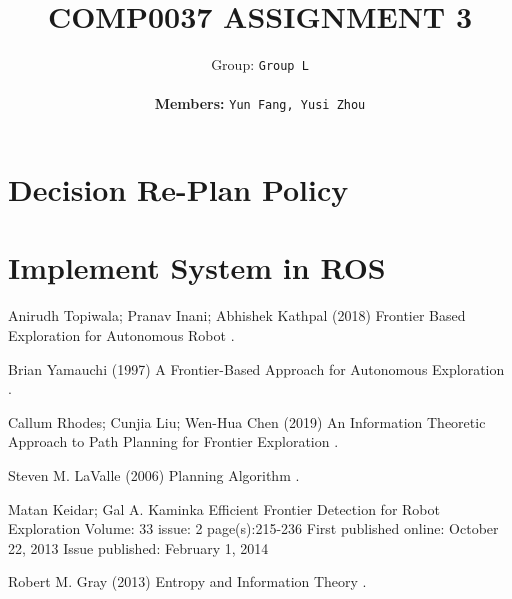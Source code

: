 \documentclass{article}
\title{COMP0037 ASSIGNMENT 3}
\author{
 Group: \texttt{Group L}\\\\
 \textbf{Members:} \texttt{Yun Fang, Yusi Zhou}
}
\begin{document}
\maketitle


\section{Decision Re-Plan Policy}

\pagebreak
\section{Implement System in ROS}

\pagebreak

  
\begin{thebibliography}{1}


 Anirudh Topiwala; Pranav Inani; Abhishek Kathpal
\newblock (2018)
\newblock Frontier Based Exploration for Autonomous Robot
.

Brian Yamauchi
\newblock (1997)
\newblock  A Frontier-Based Approach for Autonomous Exploration
.

Callum Rhodes; Cunjia Liu; Wen-Hua Chen
\newblock (2019)
\newblock An Information Theoretic Approach to Path Planning for Frontier Exploration
.

Steven M. LaValle
\newblock (2006)
\newblock Planning Algorithm
.

Matan Keidar; Gal A. Kaminka
\newblock Efficient Frontier Detection for Robot Exploration
\newblock Volume: 33 issue: 2
\newblock page(s):215-236
\newblock First published online: October 22, 2013
\newblock Issue published: February 1, 2014

Robert M. Gray
\newblock (2013)
\newblock Entropy and Information Theory
.



\end{thebibliography}


\end{document}
